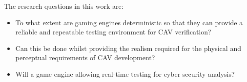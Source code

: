 \noindent The research questions in this work are:
\begin{itemize}[leftmargin=*]
    \item To what extent are gaming engines deterministic so that they can provide a reliable and repeatable testing environment for CAV verification?
    \item Can this be done whilst providing the realism required for the physical and perceptual requirements of CAV development?
    \item Will a game engine allowing real-time testing for cyber security analysis? %
\end{itemize}





